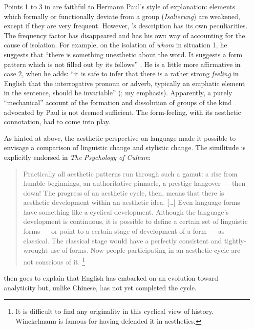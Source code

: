 \documentclass[output=paper]{langscibook}
\begin{document}
Points 1 to 3 in  are faithful to Hermann Paul's style of explanation: elements which formally or functionally deviate from a group (\emph{Isolierung}) are weakened, except if they are very frequent. However, {\Sapir}'s description has its own peculiarities. The frequency factor has disappeared and {\Sapir} has his own way of accounting for the cause of isolation. For example, on the isolation of \emph{whom} in situation 1, he suggests that ``there is something unesthetic about the word. It suggests a form pattern which is not filled out by its fellows'' \citep[158]{Sapir1921}. He is a little more affirmative in case 2, when he adds: ``it is safe to infer that there is a rather strong \emph{feeling} in English that the interrogative pronoun or adverb, typically an emphatic element in the sentence, should be invariable'' (\citealt[159]{Sapir1921}; my emphasis). Apparently, a purely ``mechanical'' account of the formation and dissolution of groups of the kind advocated by Paul is not deemed sufficient. The form-feeling, with its aesthetic connotation, had to come into play.

As hinted at above, the aesthetic perspective on language made it possible to envisage a comparison of linguistic change and stylistic change. The similitude is explicitly endorsed in \emph{The Psychology of Culture}:

\begin{quotation}
Practically all aesthetic patterns run through such a gamut: a rise from humble beginnings, an authoritative pinnacle, a prestige hangover — then down! The progress of an aesthetic cycle, then, means that there is aesthetic development within an aesthetic idea. […] Even language forms have something like a cyclical development. Although the language's development is continuous, it is possible to define a certain set of linguistic forms — or point to a certain stage of development of a form — as classical. The classical stage would have a perfectly consistent and tightly-wrought use of forms. Now people participating in an aesthetic cycle are not conscious of it. \citep[132--133]{Sapir2002}\footnote{It is difficult to find any originality in this cyclical view of history. Winckelmann is famous for having defended it in aesthetics.} 
\end{quotation}

{\Sapir} then goes to explain that English has embarked on an evolution toward analyticity but, unlike Chinese, has not yet completed the cycle.
\end{document}
